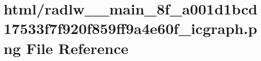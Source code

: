 \hypertarget{radlw____main__8f__a001d1bcd17533f7f920f859ff9a4e60f__icgraph_8png}{}\section{html/radlw\+\_\+\+\_\+main\+\_\+8f\+\_\+a001d1bcd17533f7f920f859ff9a4e60f\+\_\+icgraph.png File Reference}
\label{radlw____main__8f__a001d1bcd17533f7f920f859ff9a4e60f__icgraph_8png}
